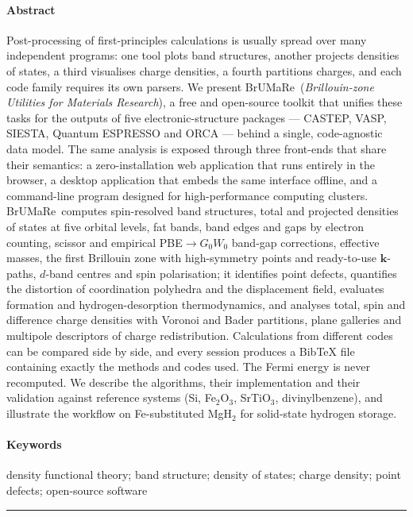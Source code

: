 \documentclass[11pt,a4paper]{article}
\newcommand{\BMR}{\textsf{BrUMa\textcolor[HTML]{B26B00}{Re}}}
\begin{document}
\begin{titlepage}
\paragraph{Abstract}
Post-processing of first-principles calculations is usually spread over many independent programs: one tool plots band structures, another projects densities of states, a third visualises charge densities, a fourth partitions charges, and each code family requires its own parsers. We present \BMR\ (\emph{Brillouin-zone Utilities for Materials Research}), a free and open-source toolkit that unifies these tasks for the outputs of five electronic-structure packages — CASTEP, VASP, SIESTA, Quantum ESPRESSO and ORCA — behind a single, code-agnostic data model. The same analysis is exposed through three front-ends that share their semantics: a zero-installation web application that runs entirely in the browser, a desktop application that embeds the same interface offline, and a command-line program designed for high-performance computing clusters. \BMR\ computes spin-resolved band structures, total and projected densities of states at five orbital levels, fat bands, band edges and gaps by electron counting, scissor and empirical PBE$\to G_0W_0$ band-gap corrections, effective masses, the first Brillouin zone with high-symmetry points and ready-to-use $\bm k$-paths, $d$-band centres and spin polarisation; it identifies point defects, quantifies the distortion of coordination polyhedra and the displacement field, evaluates formation and hydrogen-desorption thermodynamics, and analyses total, spin and difference charge densities with Voronoi and Bader partitions, plane galleries and multipole descriptors of charge redistribution. Calculations from different codes can be compared side by side, and every session produces a BibTeX file containing exactly the methods and codes used. The Fermi energy is never recomputed. We describe the algorithms, their implementation and their validation against reference systems (Si, Fe$_2$O$_3$, SrTiO$_3$, divinylbenzene), and illustrate the workflow on Fe-substituted MgH$_2$ for solid-state hydrogen storage.
\paragraph{Keywords} density functional theory; band structure; density of states; charge density; point defects; open-source software

\vspace{0.4cm}
\noindent\rule{\linewidth}{0.4pt}

\end{titlepage}
\end{document}
